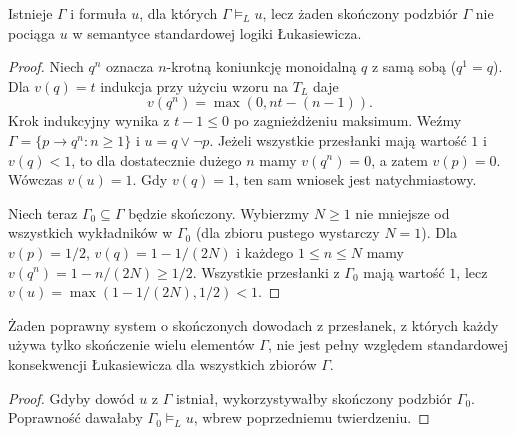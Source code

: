 \begin{twierdzenie}
\label{thm:lst-fuzzy-noncompactness}
Istnieje $\Gamma$ i formuła $u$, dla których
$\Gamma\models_L u$, lecz żaden skończony podzbiór $\Gamma$
nie pociąga $u$ w semantyce standardowej logiki Łukasiewicza.
\end{twierdzenie}
\begin{proof}
Niech $q^n$ oznacza $n$-krotną koniunkcję monoidalną $q$ z samą sobą
($q^1=q$). Dla $v(q)=t$ indukcja przy użyciu wzoru na $T_L$ daje
\[
v(q^n)=\max(0,nt-(n-1)).
\]
Krok indukcyjny wynika z $t-1\leq0$ po zagnieżdżeniu maksimum.
Weźmy $\Gamma=\{p\to q^n:n\geq1\}$ i $u=q\vee\neg p$.
Jeżeli wszystkie przesłanki mają wartość $1$ i $v(q)<1$, to dla
dostatecznie dużego $n$ mamy $v(q^n)=0$, a zatem $v(p)=0$.
Wówczas $v(u)=1$. Gdy $v(q)=1$, ten sam wniosek jest natychmiastowy.

Niech teraz $\Gamma_0\subseteq\Gamma$ będzie skończony.
Wybierzmy $N\geq1$ nie mniejsze od wszystkich wykładników
w $\Gamma_0$ (dla zbioru pustego wystarczy $N=1$).
Dla $v(p)=1/2$, $v(q)=1-1/(2N)$ i każdego $1\leq n\leq N$
mamy $v(q^n)=1-n/(2N)\geq1/2$. Wszystkie przesłanki z $\Gamma_0$
mają wartość $1$, lecz
$v(u)=\max(1-1/(2N),1/2)<1$.
\end{proof}
\begin{wniosek}
Żaden poprawny system o skończonych dowodach z przesłanek, z których
każdy używa tylko skończenie wielu elementów $\Gamma$, nie jest
pełny względem standardowej konsekwencji Łukasiewicza dla wszystkich
zbiorów $\Gamma$.
\end{wniosek}
\begin{proof}
Gdyby dowód $u$ z $\Gamma$ istniał, wykorzystywałby skończony
podzbiór $\Gamma_0$. Poprawność dawałaby $\Gamma_0\models_L u$,
wbrew poprzedniemu twierdzeniu.
\end{proof}

